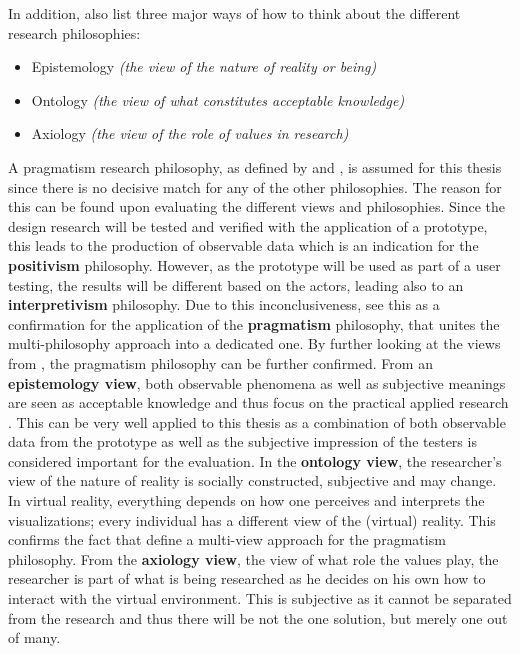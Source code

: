 In addition, \cite{Saunders2009} also list three major ways of how to think about the different research philosophies:
\begin{itemize}[noitemsep,nolistsep]
	\item Epistemology \textit{(the view of the nature of reality or being)}
	\item Ontology \textit{(the view of what constitutes acceptable knowledge)}
	\item Axiology \textit{(the view of the role of values in research)}
\end{itemize}

A pragmatism research philosophy, as defined by \cite{Vaishnavi2008} and \cite{Saunders2009}, is assumed for this thesis since there is no decisive match for any of the other philosophies. The reason for this can be found upon evaluating the different views and philosophies. \newline
Since the design research will be tested and verified with the application of a prototype, this leads to the production of observable data which is an indication for the \textbf{positivism} philosophy. However, as the prototype will be used as part of a user testing, the results will be different based on the actors, leading also to an \textbf{interpretivism} philosophy. Due to this inconclusiveness, \cite{Saunders2009} see this as a confirmation for the application of the \textbf{pragmatism} philosophy, that unites the multi-philosophy approach into a dedicated one. \newline
By further looking at the views from \cite{Saunders2009}, the pragmatism philosophy can be further confirmed. From an \textbf{epistemology view}, both observable phenomena as well as subjective meanings are seen as acceptable knowledge and thus focus on the practical applied research \citep{Saunders2009}. This can be very well applied to this thesis as a combination of both observable data from the prototype as well as the subjective impression of the testers is considered important for the evaluation. In the \textbf{ontology view}, the researcher's view of the nature of reality is socially constructed, subjective and may change. In virtual reality, everything depends on how one perceives and interprets the visualizations; every individual has a different view of the (virtual) reality. This confirms the fact that \cite{Sanders2009} define a multi-view approach for the pragmatism philosophy. From the \textbf{axiology view}, the view of what role the values play, the researcher is part of what is being researched as he decides on his own how to interact with the virtual environment. This is subjective as it cannot be separated from the research and thus there will be not the one solution, but merely one out of many. 



